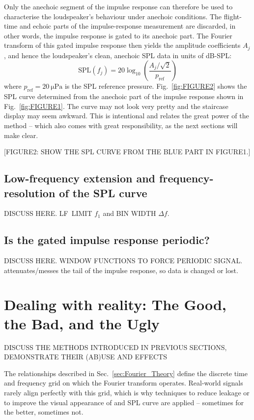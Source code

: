 \documentclass[12pt,a4paper]{article}
\providecommand{\secn}[1]{Sec.~\ref{sec:#1}}
\providecommand{\figr}[1]{Fig.~\ref{fig:#1}}
\providecommand{\pRef}{p_\mathrm{ref}}
\begin{document}
Only the anechoic segment of the impulse response can therefore be used to characterise the loudspeaker’s behaviour under anechoic conditions. The flight-time and echoic parts of the impulse-response measurement are discarded, in other words, the impulse response is gated to its anechoic part. The Fourier transform of this gated impulse response then yields the amplitude coefficients $A_j$, and hence the loudspeaker’s clean, anechoic SPL data in units of dB-SPL:
\[
\mathrm{SPL}(f_j) = 20 \log_{10}\left( \frac{A_j / \sqrt{2}}{\pRef} \right)
\]
where $\pRef = \SI{20}{\micro\pascal}$ is the SPL reference pressure. \figr{FIGURE2} shows the SPL curve determined from the anechoic part of the impulse response shown in \figr{FIGURE1}. The curve may not look very pretty and the staircase display may seem awkward. This is intentional and relates the great power of the method -- which also comes with great responsibility, as the next sections will make clear.

[FIGURE2: SHOW THE SPL CURVE FROM THE BLUE PART IN FIGURE1.]

\subsection{Low-frequency extension and frequency-resolution of the SPL curve}
DISCUSS HERE. LF LIMIT $f_1$ and BIN WIDTH $\Delta f$.


\subsection{Is the gated impulse response periodic?}
DISCUSS HERE. WINDOW FUNCTIONS TO FORCE PERIODIC SIGNAL. attenuates/messes the tail of the impulse response, so data is changed or lost.


\section{Dealing with reality: The Good, the Bad, and the Ugly}
DISCUSS THE METHODS INTRODUCED IN PREVIOUS SECTIONS, DEMONSTRATE THEIR (AB)USE AND EFFECTS 

The relationships described in \secn{Fourier_Theory} define the discrete time and frequency grid on which the Fourier transform operates. Real-world signals rarely align perfectly with this grid, which is why techniques to reduce leakage or to improve the visual appearance of and SPL curve are applied -- sometimes for the better, sometimes not.
\end{document}
